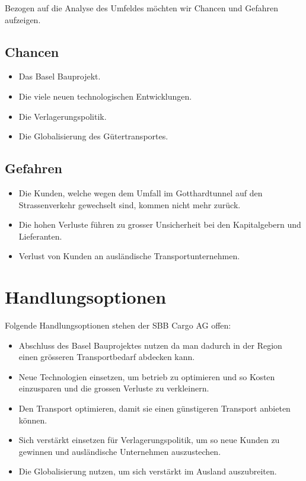 \documentclass{article}
\begin{document}
Bezogen auf die Analyse des Umfeldes möchten wir Chancen und Gefahren aufzeigen.

\subsection{Chancen}
\begin{itemize}
    \item Das Basel Bauprojekt.
    \item Die viele neuen technologischen Entwicklungen.
    \item Die Verlagerungspolitik.
    \item Die Globalisierung des Gütertransportes.
\end{itemize}
\subsection{Gefahren}
\begin{itemize}
    \item Die Kunden, welche wegen dem Umfall im Gotthardtunnel auf den Strassenverkehr gewechselt sind, kommen nicht mehr zurück.
    \item Die hohen Verluste führen zu grosser Unsicherheit bei den Kapitalgebern und Lieferanten.
    \item Verlust von Kunden an ausländische Transportunternehmen.
\end{itemize}

\section{Handlungsoptionen}

Folgende Handlungsoptionen stehen der SBB Cargo AG offen:

\begin{itemize}
    \item Abschluss des Basel Bauprojektes nutzen da man dadurch in der Region einen grösseren Transportbedarf abdecken kann. 
    \item Neue Technologien einsetzen, um betrieb zu optimieren und so Kosten einzusparen und die grossen Verluste zu verkleinern. 
    \item Den Transport optimieren, damit sie einen günstigeren Transport anbieten können. 
    \item Sich verstärkt einsetzen für Verlagerungspolitik, um so neue Kunden zu gewinnen und ausländische Unternehmen auszustechen. 
    \item Die Globalisierung nutzen, um sich verstärkt im Ausland auszubreiten. 
\end{itemize}
\end{document}
